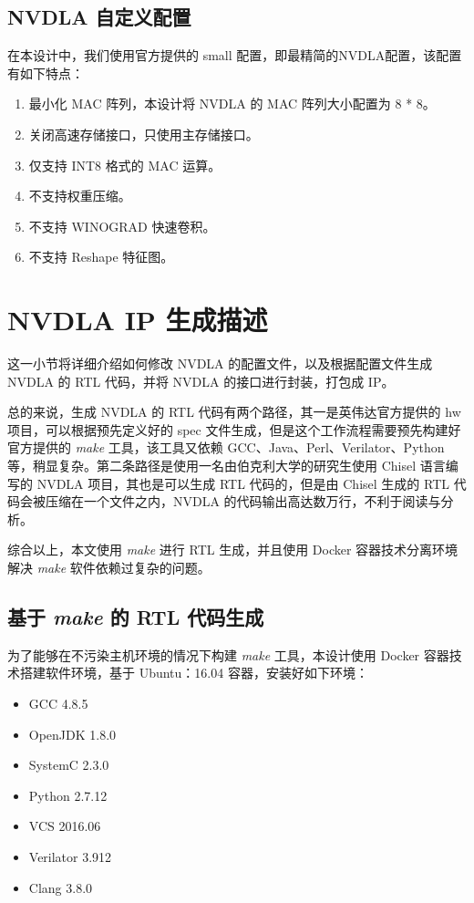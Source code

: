 \subsection{NVDLA 自定义配置}

在本设计中，我们使用官方提供的 small 配置，即最精简的NVDLA配置，该配置有如下特点：

\begin{enumerate}
    \item 最小化 MAC 阵列，本设计将 NVDLA 的 MAC 阵列大小配置为 8 * 8。
    \item 关闭高速存储接口，只使用主存储接口。
    \item 仅支持 INT8 格式的 MAC 运算。
    \item 不支持权重压缩。
    \item 不支持 WINOGRAD 快速卷积。
    \item 不支持 Reshape 特征图。
\end{enumerate}

\section{NVDLA IP 生成描述}

这一小节将详细介绍如何修改 NVDLA 的配置文件，以及根据配置文件生成 NVDLA 的 RTL 代码，并将 NVDLA 的接口进行封装，打包成 IP。

总的来说，生成 NVDLA 的 RTL 代码有两个路径，其一是英伟达官方提供的 hw 项目，可以根据预先定义好的 spec 文件生成，但是这个工作流程需要预先构建好官方提供的 \emph{make} 工具，该工具又依赖 GCC、Java、Perl、Verilator、Python 等，稍显复杂。第二条路径是使用一名由伯克利大学的研究生使用 Chisel 语言编写的 NVDLA 项目，其也是可以生成 RTL 代码的，但是由 Chisel 生成的 RTL 代码会被压缩在一个文件之内，NVDLA 的代码输出高达数万行，不利于阅读与分析。

综合以上，本文使用 \emph{make} 进行 RTL 生成，并且使用 Docker 容器技术分离环境解决 \emph{make} 软件依赖过复杂的问题。

\subsection{基于 \emph{make} 的 RTL 代码生成}

为了能够在不污染主机环境的情况下构建 \emph{make} 工具，本设计使用 Docker 容器技术搭建软件环境，基于 Ubuntu：16.04 容器，安装好如下环境：

\begin{itemize}
    \item GCC 4.8.5
    \item OpenJDK 1.8.0
    \item SystemC 2.3.0
    \item Python 2.7.12
    \item VCS 2016.06
    \item Verilator 3.912
    \item Clang 3.8.0
\end{itemize}

